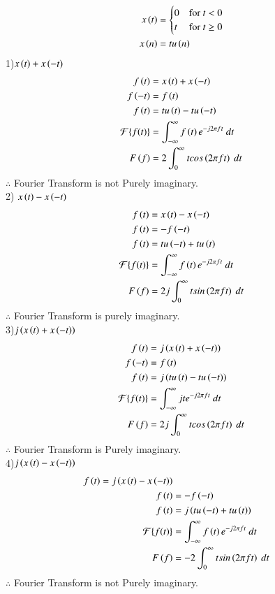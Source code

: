 \documentclass[journal,12pt,twocolumn]{IEEEtran}
\theoremstyle{remark}
\begin{document}
\begin{align} 
x\left(t\right) &= 
\begin{cases} 
0 & \text{for } t < 0 \\
t & \text{for } t \geq 0 
\end{cases}\\
x\left(n\right)&=t u\left(n\right)
\end{align}
1)$x\left(t\right) + x\left(-t\right)$
\begin{align}
  f\left(t\right)&= x\left(t\right) + x\left(-t\right)\\
  f\left(-t\right)&=f\left(t\right)\\
  f\left(t\right) &= t u\left(t\right)-t u\left(-t\right)\\
  \mathcal{F}\{f(t)\}&=\int_{-\infty}^{\infty} f\left(t\right) e^{-j 2\pi f t} \ dt\\
  F\left(f\right)&=2\int_{0}^{\infty} t  cos\left(2\pi ft\right)  \ dt
\end{align}
$\therefore$ Fourier Transform is not Purely imaginary.\\
2) $x\left(t\right) - x\left(-t\right)$
\begin{align}
  f\left(t\right)&= x\left(t\right) - x\left(-t\right)\\
f\left(t\right)&=-f\left(-t\right)\\
 f\left(t\right) &= t u\left(-t\right)+ t u\left(t\right)\\
  \mathcal{F}\{f(t)\}&=\int_{-\infty}^{\infty} f\left(t\right) e^{-j 2\pi f t} \ dt\\
  F\left(f\right)&=2j\int_{0}^{\infty} t  sin\left(2\pi ft\right)  \ dt
\end{align}
$\therefore$ Fourier Transform is purely imaginary.\\
3)$j\left(x\left(t\right) + x\left(-t\right)\right)$
\begin{align}
  f\brak{t}&= j\brak{x\brak{t} + x\brak{-t}}\\
  f\brak{-t}&=f\brak{t}\\
  f\brak{t} &= j\brak{t u\brak{t}-t u\brak{-t}}\\
  \mathcal{F}\{f(t)\}&=\int_{-\infty}^{\infty} jt e^{-j 2\pi f t} \ dt\\
  F\brak{f}&=2j\int_{0}^{\infty} t  cos\brak{2\pi ft}  \ dt
\end{align}
$\therefore$ Fourier Transform is Purely imaginary.\\
4)$j\left(x\left(t\right) - x\left(-t\right)\right)$
\begin{align}
  f\left(t\right)=j\left(x\left(t\right) - x\left(-t\right)\right)\\
f\left(t\right)&=-f\left(-t\right)\\
f\left(t\right)&=j\left(t u\left(-t\right)+ t u\left(t\right)\right)\\
  \mathcal{F}\{f(t)\}&=\int_{-\infty}^{\infty} f\left(t\right) e^{-j 2\pi f t} \ dt\\
  F\left(f\right)&=-2\int_{0}^{\infty} t  sin\left(2\pi ft\right)  \ dt
\end{align}
$\therefore$ Fourier Transform is not Purely imaginary.\\
\end{document}
